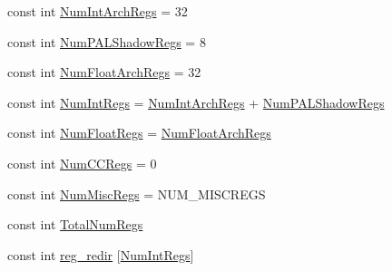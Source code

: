 \begin{DoxyCompactItemize}
\item 
const int \hyperlink{namespaceAlphaISA_a405c0abe85dc0da846c120e3b31f375c}{NumIntArchRegs} = 32
\item 
const int \hyperlink{namespaceAlphaISA_a28eb16586861c2678813557695525732}{NumPALShadowRegs} = 8
\item 
const int \hyperlink{namespaceAlphaISA_a9ec947def3616ab9415089776195fa09}{NumFloatArchRegs} = 32
\item 
const int \hyperlink{namespaceAlphaISA_a9c412b5118ce369570c156c4e156638a}{NumIntRegs} = \hyperlink{namespaceAlphaISA_a405c0abe85dc0da846c120e3b31f375c}{NumIntArchRegs} + \hyperlink{namespaceAlphaISA_a28eb16586861c2678813557695525732}{NumPALShadowRegs}
\item 
const int \hyperlink{namespaceAlphaISA_a627b25288f2452be107872a138df8b85}{NumFloatRegs} = \hyperlink{namespaceAlphaISA_a9ec947def3616ab9415089776195fa09}{NumFloatArchRegs}
\item 
const int \hyperlink{namespaceAlphaISA_a717317b863009b3e1b683c3bdddb9fd3}{NumCCRegs} = 0
\item 
const int \hyperlink{namespaceAlphaISA_a568d4aa96dd7cd963f3b1b1b0446c9c6}{NumMiscRegs} = NUM\_\-MISCREGS
\item 
const int \hyperlink{namespaceAlphaISA_a578a3508d56f10e933ba9559e2cf907c}{TotalNumRegs}
\item 
const int \hyperlink{namespaceAlphaISA_a29caebb462e412f2fced9b28d889cbde}{reg\_\-redir} \mbox{[}\hyperlink{namespaceAlphaISA_a9c412b5118ce369570c156c4e156638a}{NumIntRegs}\mbox{]}
\end{DoxyCompactItemize}


